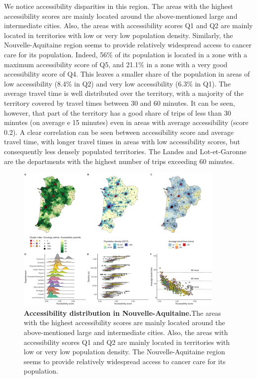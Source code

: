 We notice accessibility disparities in this region. The areas with the highest
accessibility scores are mainly located around the above-mentioned large and
intermediate cities. Also, the areas with accessibility scores Q1 and Q2 are
mainly located in territories with low or very low population density.
Similarly, the Nouvelle-Aquitaine region seems to provide relatively widespread
access to cancer care for its population. Indeed, 56\% of its population is
located in a zone with a maximum accessibility score of Q5, and 21.1\% in a zone
with a very good accessibility score of Q4. This leaves a smaller share of the
population in areas of low accessibility (8.4\% in Q2) and very low
accessibility (6.3\% in Q1). The average travel time is well distributed over
the territory, with a majority of the territory covered by travel times between
30 and 60 minutes. It can be seen, however, that part of the territory has a
good share of trips of less than 30 minutes (on average e 15 minutes) even in
areas with average accessibility (score 0.2). A clear correlation can be seen
between accessibility score and average travel time, with longer travel times in
areas with low accessibility scores, but consequently less densely populated
territories. The Landes and Lot-et-Garonne are the departments with the highest
number of trips exceeding 60 minutes.

\begin{figure}[h!]
    \includegraphics[width=0.9\textwidth]{images/camion/region_accessibility/accessibility_Nouvelle-Aquitaine.png}
    \centering
    \caption{
        \textbf{Accessibility distribution in Nouvelle-Aquitaine.}The areas with the highest accessibility scores are mainly located around the
        above-mentioned large and intermediate cities. Also, the areas with
        accessibility scores Q1 and Q2 are mainly located in territories with low or
        very low population density. The Nouvelle-Aquitaine region seems to
        provide relatively widespread access to cancer care for its population.
    }
\end{figure}

